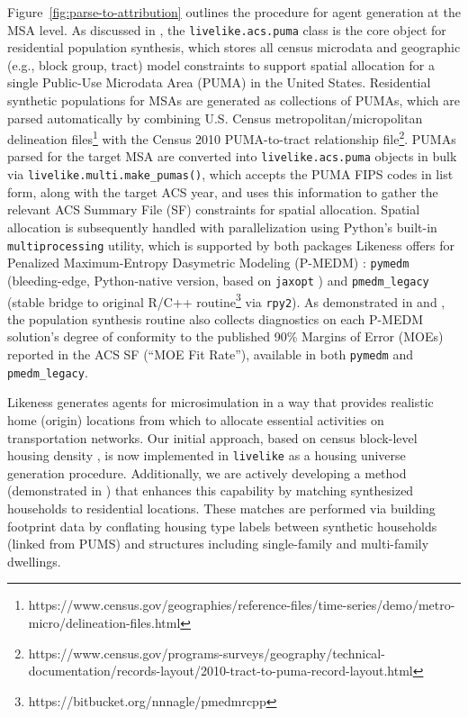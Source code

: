 Figure~\ref{fig:parse-to-attribution} outlines the procedure for agent generation at the MSA level. As discussed in \cite{likeness-scipy-paper-2022}, the \texttt{livelike.acs.puma} class is the core object for residential population synthesis, which stores all census microdata and geographic (e.g., block group, tract) model constraints to support spatial allocation for a single Public-Use Microdata Area (PUMA) in the United States. Residential synthetic populations for MSAs are generated as collections of PUMAs, which are parsed automatically by combining U.S. Census metropolitan/micropolitan delineation files\footnote{https://www.census.gov/geographies/reference-files/time-series/demo/metro-micro/delineation-files.html} with the Census 2010 PUMA-to-tract relationship file\footnote{https://www.census.gov/programs-surveys/geography/technical-documentation/records-layout/2010-tract-to-puma-record-layout.html}. PUMAs parsed for the target MSA are converted into \texttt{livelike.acs.puma} objects in bulk via \texttt{livelike.multi.make\_pumas()}, which accepts the PUMA FIPS codes in list form, along with the target ACS year, and uses this information to gather the relevant ACS Summary File (SF) constraints for spatial allocation. Spatial allocation is subsequently handled with parallelization using Python's built-in \texttt{multiprocessing} utility, which is supported by both packages Likeness offers for Penalized Maximum-Entropy Dasymetric Modeling (P-MEDM) \cite{nagle2014dasymetric}: \texttt{pymedm} (bleeding-edge, Python-native version, based on \texttt{jaxopt} \cite{jaxopt_implicit_diff}) and \texttt{pmedm\_legacy} (stable bridge to original R/C++ routine\footnote{https://bitbucket.org/nnnagle/pmedmrcpp} via \texttt{rpy2}). As demonstrated in \cite{likeness-scipy-paper-2022} and \cite{likeness-scipy-poster-2022}, the population synthesis routine also collects diagnostics on each P-MEDM solution's degree of conformity to the published 90\% Margins of Error (MOEs) reported in the ACS SF (``MOE Fit Rate''), available in both \texttt{pymedm} and \texttt{pmedm\_legacy}. 

Likeness generates agents for microsimulation in a way that provides realistic home (origin) locations from which to allocate essential activities on transportation networks. Our initial approach, based on census block-level housing density \cite{likeness-scipy-paper-2022, likeness-scipy-poster-2022}, is now implemented in \texttt{livelike} as a housing universe generation procedure. Additionally, we are actively developing a method (demonstrated in ) that enhances this capability by matching synthesized households to residential locations. These matches are performed via building footprint data by conflating housing type labels between synthetic households (linked from PUMS) and structures including single-family and multi-family dwellings. 

